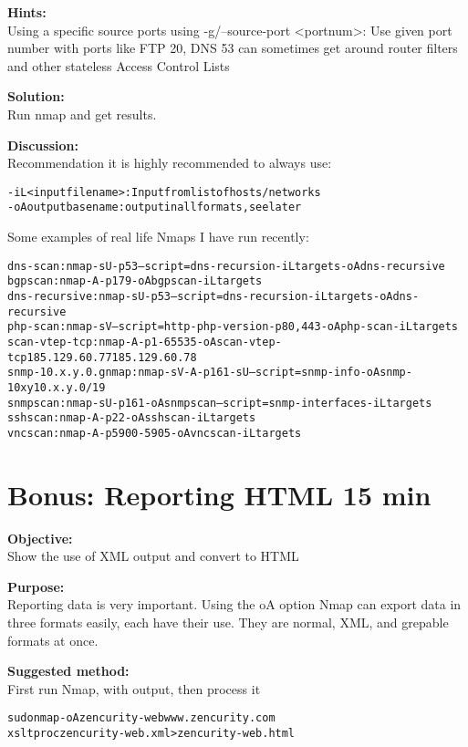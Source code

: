 \documentclass[a4paper,11pt,notitlepage]{report}
\begin{document}
{\bf Hints:} \\
Using a specific source ports using -g/--source-port <portnum>: Use given port number with ports like FTP 20, DNS 53 can sometimes get around router filters and other stateless Access Control Lists

{\bf Solution:}\\
Run nmap and get results.

{\bf Discussion:}\\
Recommendation it is highly recommended to always use:
\begin{alltt}
-iL <inputfilename>: Input from list of hosts/networks
-oA outputbasename: output in all formats, see later
\end{alltt}

Some examples of real life Nmaps I have run recently:
\begin{alltt}
dns-scan: nmap -sU -p 53 --script=dns-recursion -iL targets -oA dns-recursive
bgpscan: nmap -A -p 179 -oA bgpscan -iL targets
dns-recursive: nmap -sU -p 53 --script=dns-recursion -iL targets -oA dns-recursive
php-scan: nmap -sV --script=http-php-version -p80,443 -oA php-scan -iL targets
scan-vtep-tcp: nmap -A -p 1-65535 -oA scan-vtep-tcp 185.129.60.77 185.129.60.78
snmp-10.x.y.0.gnmap: nmap -sV -A -p 161 -sU --script=snmp-info -oA snmp-10xy 10.x.y.0/19
snmpscan: nmap -sU -p 161 -oA snmpscan --script=snmp-interfaces -iL targets
sshscan: nmap -A -p 22 -oA sshscan -iL targets
vncscan: nmap -A -p 5900-5905 -oA vncscan -iL targets
\end{alltt}




\chapter{Bonus: Reporting HTML 15 min}
\label{ex:nmap-html}


{\bf Objective:} \\
Show the use of XML output and convert to HTML

{\bf Purpose:}\\
Reporting data is very important. Using the oA option Nmap can export data in three formats easily, each have their use. They are normal, XML, and grepable formats at once.

{\bf Suggested method:}\\
First run Nmap, with output, then process it
\begin{alltt}
  sudo nmap -oA zencurity-web www.zencurity.com
  xsltproc zencurity-web.xml > zencurity-web.html
\end{alltt}
\end{document}
